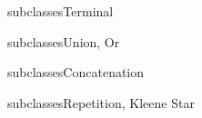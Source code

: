 \newsavebox\leafbox
\begin{lrbox}{\leafbox}
  \begin{minipage}{12cm}
    
  \end{minipage}
\end{lrbox}

\begin{frame}{ subclasses}{Terminal}
  \usebox\leafbox
\end{frame}

\newsavebox\orbox
\begin{lrbox}{\orbox}
  \begin{minipage}{12cm}
    
  \end{minipage}
\end{lrbox}

\newsavebox\andbox
\begin{lrbox}{\andbox}
  \begin{minipage}{12cm}
    
  \end{minipage}
\end{lrbox}


\begin{frame}{ subclasses}{Union, Or}
  \usebox\orbox
 \end{frame}




\newsavebox\catbox
\begin{lrbox}{\catbox}
  \begin{minipage}{12cm}
    
  \end{minipage}
\end{lrbox}


\begin{frame}{ subclasses}{Concatenation}
  \usebox\catbox
 \end{frame}



\newsavebox\starbox
\begin{lrbox}{\starbox}
  \begin{minipage}{12cm}
    
  \end{minipage}
\end{lrbox}

\newsavebox\notbox
\begin{lrbox}{\notbox}
  \begin{minipage}{12cm}
    
  \end{minipage}
\end{lrbox}


\begin{frame}{ subclasses}{Repetition, Kleene Star}
  \usebox\starbox
\end{frame}

